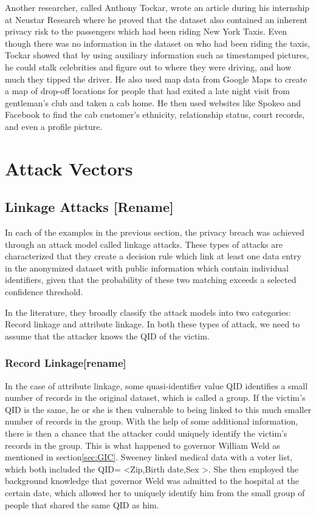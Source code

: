 Another researcher, called Anthony Tockar, wrote an article during his internship at Neustar Research where he proved that the dataset also contained an inherent privacy risk to the passengers which had been riding New York Taxis. Even though there was no information in the dataset on who had been riding the taxis, Tockar showed that by using auxiliary information such as timestamped pictures, he could stalk celebrities and figure out to where they were driving, and how much they tipped the driver. He also used map data from Google Maps to create a map of drop-off locations for people that had exited a late night visit from gentleman's club and taken a cab home. He then used websites like Spokeo and Facebook to find the cab customer's ethnicity, relationship status, court records, and even a profile picture\cite{tockar2014online}.

\section{Attack Vectors}


\subsection{Linkage Attacks [Rename]}
In each of the examples in the previous section, the privacy breach was achieved through an attack model called linkage attacks. These types of attacks are characterized that they create a decision rule which link at least one data entry in the anonymized dataset with public information which contain individual identifiers, given that the probability of these two matching exceeds a selected confidence threshold. 

In the literature\cite{bonchi2010privacybook,fung2010privacybook}, they broadly classify the attack models into two categories: Record linkage and attribute linkage. In both these types of attack, we need to assume that the attacker knows the QID of the victim.

\subsubsection{Record Linkage[rename]}
In the case of attribute linkage, some quasi-identifier value QID identifies a small number of records in the original dataset, which is called a group. If the victim's QID is the same, he or she is then vulnerable to being linked to this much smaller number of records in the group. With the help of some additional information, there is then a chance that the attacker could uniquely identify the victim's records in the group. This is what happened to governor William Weld as mentioned in section\ref{sec:GIC}. Sweeney linked medical data with a voter list, which both included the QID= \textless Zip,Birth date,Sex \textgreater. She then employed the background knowledge that governor Weld was admitted to the hospital at the certain date, which allowed her to uniquely identify him from the small group of people that shared the same QID as him. 


